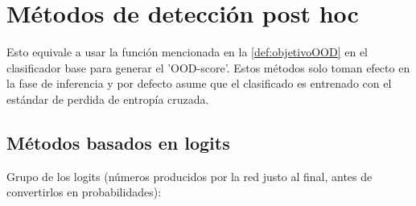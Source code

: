%

\chapter{Métodos de detección post hoc}\label{cap:metodos}


Esto equivale a usar la función mencionada en la \cref{def:objetivoOOD} en el clasificador base para generar el 'OOD-score'. Estos métodos solo toman 
efecto en la fase de inferencia y por defecto asume que el clasificado es entrenado con el estándar de perdida de entropía cruzada.
\section{Métodos basados en logits}\label{sec:metodos-logits}

Grupo de los logits (números producidos por la red justo al final, antes de convertirlos en probabilidades):

